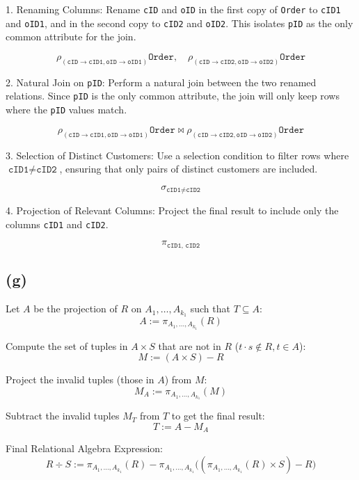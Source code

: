 \documentclass{article}
\begin{document}
1. Renaming Columns:
Rename \texttt{cID} and \texttt{oID} in the first copy of \texttt{Order} to \texttt{cID1} and \texttt{oID1}, and in the second copy to \texttt{cID2} and \texttt{oID2}. This isolates \texttt{pID} as the only common attribute for the join.

$$
    \rho_{(\texttt{cID} \rightarrow \texttt{cID1}, \texttt{oID} \rightarrow \texttt{oID1})} \texttt{Order}, \quad \rho_{(\texttt{cID} \rightarrow \texttt{cID2}, \texttt{oID} \rightarrow \texttt{oID2})} \texttt{Order}
$$

2. Natural Join on \texttt{pID}:
Perform a natural join between the two renamed relations. Since \texttt{pID} is the only common attribute, the join will only keep rows where the \texttt{pID} values match.

$$
    \rho_{(\texttt{cID} \rightarrow \texttt{cID1}, \texttt{oID} \rightarrow \texttt{oID1})} \texttt{Order} \bowtie \rho_{(\texttt{cID} \rightarrow \texttt{cID2}, \texttt{oID} \rightarrow \texttt{oID2})} \texttt{Order}
$$

3. Selection of Distinct Customers:
Use a selection condition to filter rows where $\texttt{cID1} \neq \texttt{cID2}$, ensuring that only pairs of distinct customers are included.

$$
    \sigma_{\texttt{cID1} \neq \texttt{cID2}}
$$

4. Projection of Relevant Columns:
Project the final result to include only the columns \texttt{cID1} and \texttt{cID2}.

$$
    \pi_{\texttt{cID1, cID2}}
$$

\newpage
\subsection*{(g)}
Let $ A $ be the projection of $ R $ on $ A_1, \ldots, A_{k_1} $ such that $T\subseteq A$:
$$
    A := \pi_{A_1, \ldots, A_{k_1}}(R)
$$

Compute the set of tuples in $ A \times S $ that are not in $ R $ ($t\cdot s\notin R, t\in A$):
$$
    M := (A \times S) - R
$$

Project the invalid tuples (those in $ A $) from $ M $:
$$
    M_A := \pi_{A_1, \ldots, A_{k_1}}(M)
$$

Subtract the invalid tuples $ M_T $ from $ T $ to get the final result:
$$
    T := A - M_A
$$

Final Relational Algebra Expression:
$$
    R \div S := \pi_{A_1, \ldots, A_{k_1}}(R) - \pi_{A_1, \ldots, A_{k_1}} \bigg( ( \pi_{A_1, \ldots, A_{k_1}}(R) \times S ) - R \bigg)
$$
\end{document}

